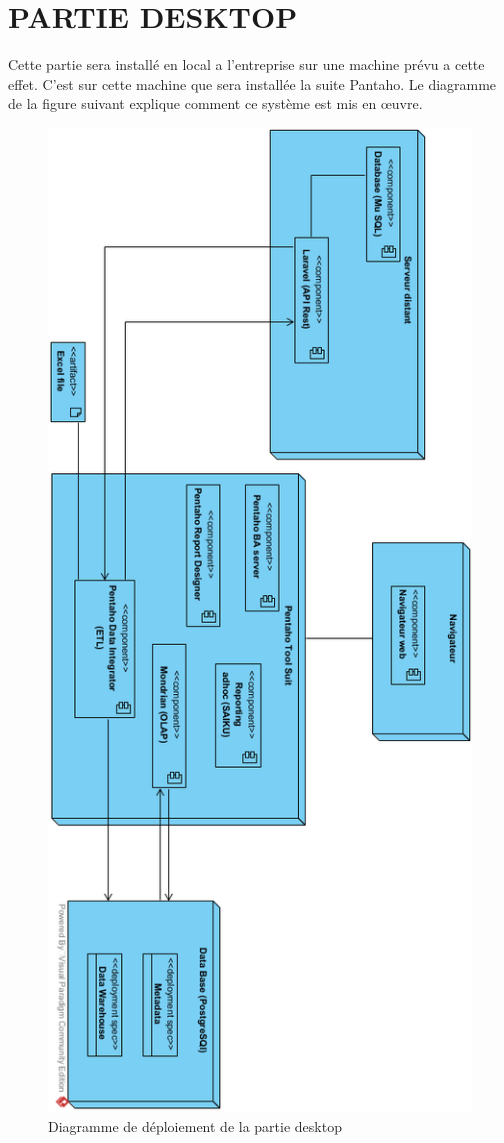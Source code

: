 \cleardoublepage
\section{PARTIE DESKTOP}
Cette partie sera installé en local a l’entreprise sur une machine prévu a cette effet. C’est sur cette machine que sera installée la suite Pantaho. Le diagramme de la figure suivant explique comment ce système est mis en œuvre.

\begin{figure}[!htbp]
	\begin{center}
		\includegraphics[scale=0.65]{images/deploy_desktop.png}
	\caption{Diagramme de déploiement de la partie desktop}
		\label{use_case_diagramme_one}
	\end{center}
\end{figure}





